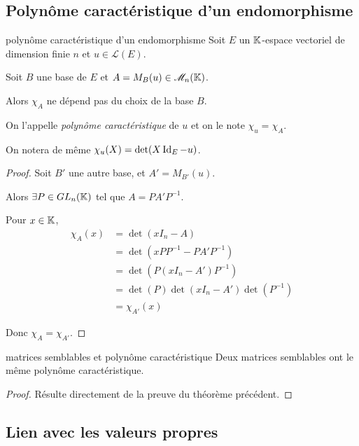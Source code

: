 \subsection{Polynôme caractéristique d'un endomorphisme}

\begin{theoreme}{polynôme caractéristique d'un endomorphisme}{}
    Soit $E$ un $\mathbb{K}$-espace vectoriel de dimension finie $n$ et $u \in \mathscr L(E)$.

    Soit $B$ une base de $E$ et $A = M_B(u) \in \mathscr M_n(\mathbb{K})$. 

    Alors $\chi_A$ ne dépend pas du choix de la base $B$.

    On l'appelle \emph{polynôme caractéristique} de $u$ et on le note $\chi_u = \chi_A$.

    On notera de même $\chi_u(X) = \det(X \operatorname{Id}_E - u)$.
\end{theoreme}


\begin{proof}
    Soit $B'$ une autre base, et $A' = M_{B'}(u)$.

    Alors $\exists P \in GL_n(\mathbb{K})$ tel que $A = P A' P^{-1}$.

    Pour $x \in \mathbb{K}$, 
    \begin{align}
        \chi_A(x) & = \det(x I_n - A) \\
                        & = \det(x PP^{-1} - P A' P^{-1}) \\
                        & = \det(P(x I_n - A') P^{-1}) \\
                        & = \det(P) \det(x I_n - A') \det(P^{-1}) \\
                        & = \chi_{A'}(x)
    \end{align}

    Donc $\chi_A = \chi_{A'}$.
\end{proof}

\begin{corollaire}{matrices semblables et polynôme caractéristique}{}
    Deux matrices semblables ont le même polynôme caractéristique.
\end{corollaire}

\begin{proof}
    Résulte directement de la preuve du théorème précédent.
\end{proof}


\subsection{Lien avec les valeurs propres }

